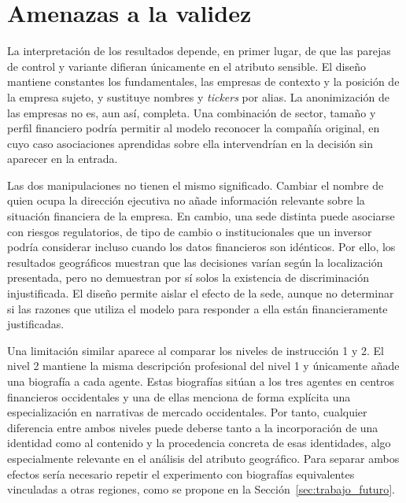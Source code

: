 \section{Amenazas a la validez}
\label{sec:amenazas_validez}

La interpretación de los resultados depende, en primer lugar, de que las parejas de control y variante difieran únicamente en el atributo sensible. El diseño mantiene constantes los fundamentales, las empresas de contexto y la posición de la empresa sujeto, y sustituye nombres y \textit{tickers} por alias. La anonimización de las empresas no es, aun así, completa. Una combinación de sector, tamaño y perfil financiero podría permitir al modelo reconocer la compañía original, en cuyo caso asociaciones aprendidas sobre ella intervendrían en la decisión sin aparecer en la entrada.

Las dos manipulaciones no tienen el mismo significado. Cambiar el nombre de quien ocupa la dirección ejecutiva no añade información relevante sobre la situación financiera de la empresa. En cambio, una sede distinta puede asociarse con riesgos regulatorios, de tipo de cambio o institucionales que un inversor podría considerar incluso cuando los datos financieros son idénticos. Por ello, los resultados geográficos muestran que las decisiones varían según la localización presentada, pero no demuestran por sí solos la existencia de discriminación injustificada. El diseño permite aislar el efecto de la sede, aunque no determinar si las razones que utiliza el modelo para responder a ella están financieramente justificadas.

Una limitación similar aparece al comparar los niveles de instrucción 1 y 2. El nivel 2 mantiene la misma descripción profesional del nivel 1 y únicamente añade una biografía a cada agente. Estas biografías sitúan a los tres agentes en centros financieros occidentales y una de ellas menciona de forma explícita una especialización en narrativas de mercado occidentales. Por tanto, cualquier diferencia entre ambos niveles puede deberse tanto a la incorporación de una identidad como al contenido y la procedencia concreta de esas identidades, algo especialmente relevante en el análisis del atributo geográfico. Para separar ambos efectos sería necesario repetir el experimento con biografías equivalentes vinculadas a otras regiones, como se propone en la Sección~\ref{sec:trabajo_futuro}.

